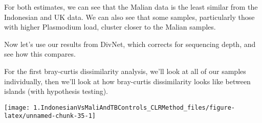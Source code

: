\documentclass[]{article}
\newenvironment{Shaded}{\begin{snugshade}}{\end{snugshade}}
\newcommand{\CommentTok}[1]{\textcolor[rgb]{0.56,0.35,0.01}{\textit{#1}}}
\newcommand{\DataTypeTok}[1]{\textcolor[rgb]{0.13,0.29,0.53}{#1}}
\newcommand{\FloatTok}[1]{\textcolor[rgb]{0.00,0.00,0.81}{#1}}
\newcommand{\KeywordTok}[1]{\textcolor[rgb]{0.13,0.29,0.53}{\textbf{#1}}}
\newcommand{\NormalTok}[1]{#1}
\newcommand{\OperatorTok}[1]{\textcolor[rgb]{0.81,0.36,0.00}{\textbf{#1}}}
\newcommand{\StringTok}[1]{\textcolor[rgb]{0.31,0.60,0.02}{#1}}
\begin{document}
For both estimates, we can see that the Malian data is the least similar
from the Indonesian and UK data. We can also see that some samples,
particularly those with higher Plasmodium load, cluster closer to the
Malian samples.

Now let's use our results from DivNet, which corrects for sequencing
depth, and see how this compares.

For the first bray-curtis dissimilarity analysis, we'll look at all of
our samples individually, then we'll look at how bray-curtis
dissimilarity looks like between islands (with hypothesis testing).

\begin{Shaded}
\end{Shaded}

\begin{center}\texttt{[image: 1.IndonesianVsMaliAndTBControls\_CLRMethod\_files/figure-latex/unnamed-chunk-35-1]} \end{center}
\end{document}
